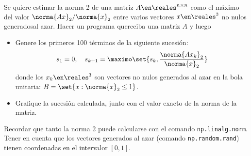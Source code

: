\begin{enunciado}{\ejercicio}
  Se quiere estimar la norma 2 de una matriz $A \en \reales^{n \times n}$ como el máximo del valor
  $ \norma{Ax}_2 / \norma{x}_2 $ entre varios vectores $x \en \reales^3$ no nulos generadosal azar.
  Hacer un programa quereciba una matriz $A$ y luego
  \begin{itemize}
    \item Genere los primeros 100 términos de la siguiente sucesión:
          $$
            s_1 = 0, \quad s_{k+1} = \maximo\set{s_k, \frac{\norma{Ax_k}_2}{\norma{x}_2}}
          $$
          donde los $x_k \en \reales^3$ son vectores no nulos generados al azar en la bola unitaria:
          $B = \set{x : \norma{x}_2 \leq 1}$.

    \item Grafique la sucesión calculada, junto con el valor exacto de la norma de la matriz.
  \end{itemize}

  Recordar que tanto la norma 2 puede calcularse con el comando \texttt{np.linalg.norm}. Tener en cuenta
  que los vectores generados al azar (comando \texttt{np.random.rand}) tienen coordenadas en el intervalor $[0,1]$.
\end{enunciado}


